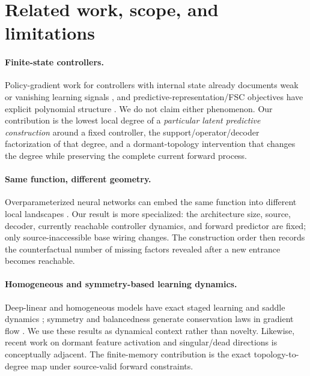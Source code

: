 \section{Related work, scope, and limitations}
\label{sec:related}

\paragraph{Finite-state controllers.}
Policy-gradient work for controllers with internal state already documents weak or vanishing learning signals \citep{aberdeen2002scaling}, and predictive-representation/FSC objectives have explicit polynomial structure \citep{boularias2009predictive}. We do not claim either phenomenon. Our contribution is the lowest local degree of a \emph{particular latent predictive construction} around a fixed controller, the support/operator/decoder factorization of that degree, and a dormant-topology intervention that changes the degree while preserving the complete current forward process.

\paragraph{Same function, different geometry.}
Overparameterized neural networks can embed the same function into different local landscapes \citep{fukumizu2019semiflat}. Our result is more specialized: the architecture size, source, decoder, currently reachable controller dynamics, and forward predictor are fixed; only source-inaccessible base wiring changes. The construction order then records the counterfactual number of missing factors revealed after a new entrance becomes reachable.

\paragraph{Homogeneous and symmetry-based learning dynamics.}
Deep-linear and homogeneous models have exact staged learning and saddle dynamics \citep{saxe2014exact,rawal2026saddle}; symmetry and balancedness generate conservation laws in gradient flow \citep{kunin2020neural,tanaka2021noether}. We use these results as dynamical context rather than novelty. Likewise, recent work on dormant feature activation \citep{kunin2025alternating} and singular/dead directions \citep{shirodkar2026dead} is conceptually adjacent. The finite-memory contribution is the exact topology-to-degree map under source-valid forward constraints.

